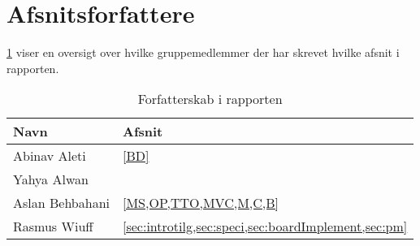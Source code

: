 \appendix
\appendixpage
\addappheadtotoc
\section{Afsnitsforfattere}\label{sec:arbejde}
\cref{tbl:arbejde} viser en oversigt over hvilke gruppemedlemmer der har skrevet hvilke afsnit i rapporten.
\begin{table}[H]
    \centering
    \caption{Forfatterskab i rapporten}\label{tbl:arbejde}
    \begin{tabular}{ll}
        \toprule
        Navn            & Afsnit                                                   \\
        \midrule
        Abinav Aleti    & \cref{BD}                                                \\
        \midrule
        Yahya Alwan     &                                                          \\
        \midrule
        Aslan Behbahani & \cref{MS,OP,TTO,MVC,M,C,B}                               \\
        \midrule
        Rasmus Wiuff    & \cref{sec:introtilg,sec:speci,sec:boardImplement,sec:pm} \\
        \bottomrule
    \end{tabular}
\end{table}